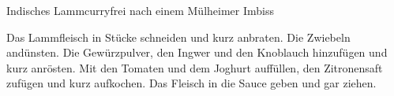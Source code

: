 \begin{recipe}{Indisches Lammcurry}{frei nach einem Mülheimer Imbiss}
  \label{Indisches Lammcurry}
  \inglist
  
  \steps
  Das Lammfleisch in Stücke schneiden und kurz anbraten. Die Zwiebeln andünsten. Die 
  Gewürzpulver, den Ingwer und den Knoblauch hinzufügen und kurz anrösten. Mit den 
  Tomaten und dem Joghurt auffüllen, den Zitronensaft zufügen und kurz aufkochen. Das 
  Fleisch in die Sauce geben und gar ziehen.
\end{recipe}

